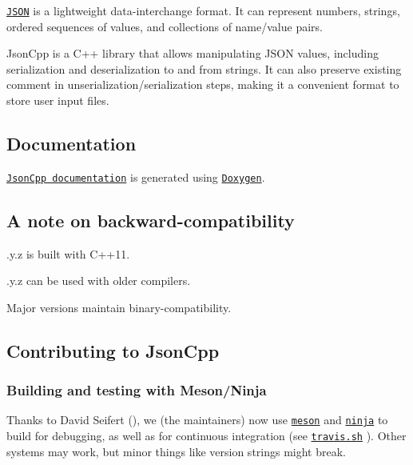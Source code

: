 \href{http://www.conan.io/source/jsoncpp/1.8.0/theirix/ci}{\tt }

\href{http://json.org/}{\tt J\+S\+ON} is a lightweight data-\/interchange format. It can represent numbers, strings, ordered sequences of values, and collections of name/value pairs.

Json\+Cpp is a C++ library that allows manipulating J\+S\+ON values, including serialization and deserialization to and from strings. It can also preserve existing comment in unserialization/serialization steps, making it a convenient format to store user input files.

\subsection*{Documentation}

\href{http://open-source-parsers.github.io/jsoncpp-docs/doxygen/index.html}{\tt Json\+Cpp documentation} is generated using \href{http://www.doxygen.org}{\tt Doxygen}.

\subsection*{A note on backward-\/compatibility}


\begin{DoxyItemize}
\item {.\+y.\+z} is built with C++11.
\item {.\+y.\+z} can be used with older compilers.
\item Major versions maintain binary-\/compatibility.
\end{DoxyItemize}

\subsection*{Contributing to Json\+Cpp}

\subsubsection*{Building and testing with Meson/\+Ninja}

Thanks to David Seifert (), we (the maintainers) now use \href{http://mesonbuild.com/}{\tt meson} and \href{https://ninja-build.org/}{\tt ninja} to build for debugging, as well as for continuous integration (see \href{travis.sh}{\tt {\ttfamily travis.\+sh}} ). Other systems may work, but minor things like version strings might break.

